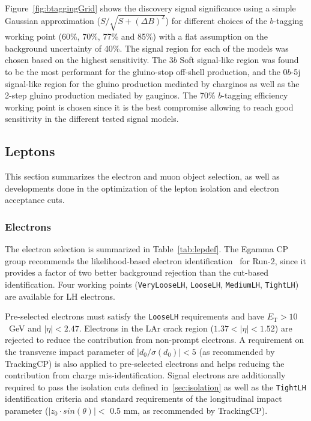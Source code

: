 Figure~\ref{fig:btaggingGrid} shows the discovery signal significance using a simple Gaussian approximation ($S/\sqrt{S+(\Delta B)^2}$) for different choices of the $b$-tagging working point (60\%, 70\%, 77\% and 85\%) with a flat assumption on the background uncertainty of 40\%. The signal region for each of the models was chosen based on the highest sensitivity.
The 3$b$ Soft signal-like region was found to be the most performant for the gluino-stop off-shell production, 
and the 0$b$-5j signal-like region for the gluino production mediated by charginos as well as the 2-step 
gluino production mediated by gauginos. 
The 70\% $b$-tagging efficiency working point is chosen since it is the best compromise allowing to reach good sensitivity in the different tested signal models.


\subsection{Leptons}
\label{sec:objects_leptons}

This section summarizes the electron and muon object selection, as well as developments done in the optimization of the
lepton isolation and electron acceptance cuts.

\subsubsection{Electrons}
\label{sec:objects_electrons}

The electron selection is summarized in Table~\ref{tab:lepdef}. The Egamma CP group recommends the likelihood-based electron identification~\cite{ATLAS-CONF-2014-032} for Run-2, since it provides a factor of two better background rejection than the cut-based identification.
Four working points ({\tt VeryLooseLH}, {\tt LooseLH}, {\tt MediumLH}, {\tt TightLH}) are available for LH electrons.

Pre-selected electrons must satisfy the {\tt LooseLH} requirements and have $E_\mathrm{T}>10$~GeV and $|\eta|<2.47$. 
Electrons in the LAr crack region ($1.37<|\eta|<1.52$) are rejected to reduce the contribution from non-prompt electrons. 
A requirement on the transverse impact parameter of $|d_0/\sigma(d_0)|<5$ (as recommended by TrackingCP) is also applied to pre-selected electrons and helps reducing the contribution from charge mis-identification. 
Signal electrons are additionally required to pass the isolation cuts defined in~\ref{sec:isolation} 
as well as the {\tt TightLH} identification criteria and standard requirements of the longitudinal impact parameter ($|z_0 \cdot sin(\theta)|<$ 0.5 mm, as recommended by TrackingCP).


